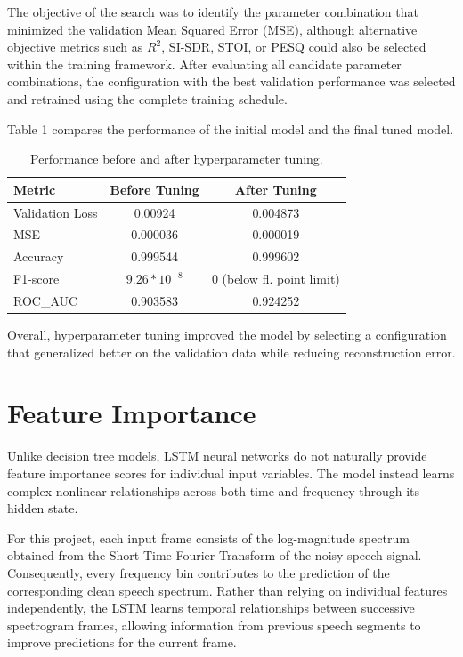 \documentclass[11pt, letterpaper]{article}
\begin{document}
The objective of the search was to identify the parameter combination that minimized the validation Mean Squared Error (MSE), although alternative objective metrics such as $R^2$, SI-SDR, STOI, or PESQ could also be selected within the training framework. After evaluating all candidate parameter combinations, the configuration with the best validation performance was selected and retrained using the complete training schedule.

Table 1 compares the performance of the initial model and the final tuned model.

	\begin{table}[h]
\centering
\caption{Performance before and after hyperparameter tuning.}
\label{tab:tuning_results}
\begin{tabular}{lcc}
\hline
Metric & Before Tuning & After Tuning \\
\hline

Validation Loss & 0.00924 & 0.004873 \\
MSE & 0.000036 & 0.000019 \\
Accuracy & 0.999544 &0.999602 \\
F1-score & $9.26 * 10^{-8}$ & 0 (below fl. point limit) \\
ROC\_AUC & 0.903583 & 0.924252 \\ 
\hline
	\end{tabular}
\end{table}

Overall, hyperparameter tuning improved the model by selecting a configuration that generalized better on the validation data while reducing reconstruction error.



\section{Feature Importance}

Unlike decision tree models, LSTM neural networks do not naturally provide feature importance scores for individual input variables. The model instead learns complex nonlinear relationships across both time and frequency through its hidden state.

For this project, each input frame consists of the log-magnitude spectrum obtained from the Short-Time Fourier Transform of the noisy speech signal. Consequently, every frequency bin contributes to the prediction of the corresponding clean speech spectrum. Rather than relying on individual features independently, the LSTM learns temporal relationships between successive spectrogram frames, allowing information from previous speech segments to improve predictions for the current frame.
\end{document}
